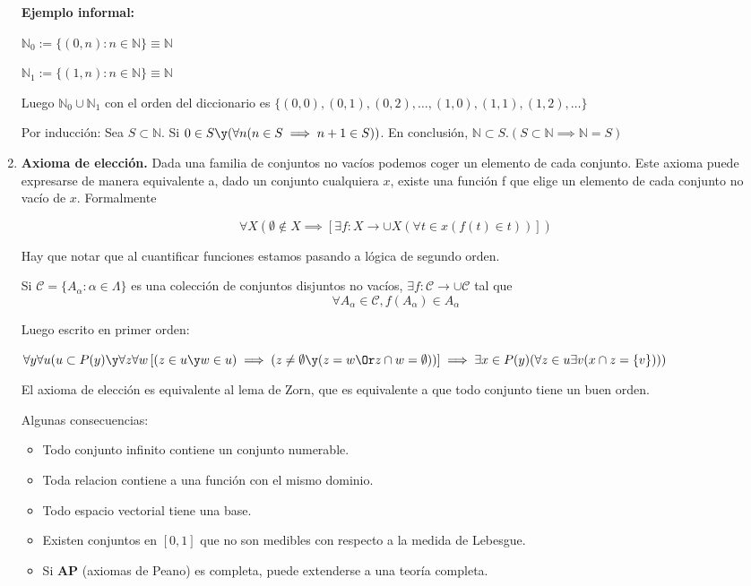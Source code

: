 \begin{enumerate}
		 \textbf{Ejemplo informal:}

		 $\mathbb{N}_0:=\{(0, n): n\in \mathbb{N}\}\equiv \mathbb{N}$

		 $\mathbb{N}_1:=\{(1, n): n\in \mathbb{N}\}\equiv \mathbb{N}$

		 Luego $\mathbb{N}_0\cup\mathbb{N}_1$ con el orden del diccionario es $\{(0,0), (0,1), (0,2), \hdots, (1,0),(1,1), (1,2), \hdots\}$

		 Por inducción: Sea $S\subset\mathbb{N}$. Si $0\in S\y(\forall n(n\in S\implies n+1\in S))$. En conclusión, $\mathbb{N}\subset S. (S\subset \mathbb{N}\implies \mathbb{N}=S)$

		 \item \textbf{Axioma de elección.} Dada una familia de conjuntos no vacíos podemos coger un elemento de cada conjunto. Este axioma puede expresarse de manera equivalente a, dado un conjunto cualquiera $x$, existe una función f que elige un elemento de cada conjunto no vacío de $x$. Formalmente

		 $$\forall X(\emptyset\notin X \implies \left[ \exists f:X\to\cup X (\forall t\in x(f(t)\in t))\right])$$

		 Hay que notar que al cuantificar funciones estamos pasando a lógica de segundo orden.

		 Si $\mathcal{C}=\{A_\alpha: \alpha\in \Lambda\}$ es una colección de conjuntos disjuntos no vacíos, $\exists f:\mathcal{C}\to \cup\mathcal{C}$ tal que $$\forall A_\alpha \in \mathcal{C}, f(A_\alpha)\in A_\alpha$$

		 Luego escrito en primer orden:

		 $\forall y\forall u (u\subset P(y) \y \forall z\forall w\left[(z\in u \y w\in u)\implies (z\neq \emptyset\y (z = w \Or z\cap w = \emptyset ))\right]\implies \exists x \in P(y) (\forall z \in u \exists v (x\cap z = \{v\})))$

		 El axioma de elección es equivalente al lema de Zorn, que es equivalente a que todo conjunto tiene un buen orden.

		 Algunas consecuencias:
		 \begin{itemize}
		 	\item Todo conjunto infinito contiene un conjunto numerable.
		 	\item Toda relacion contiene a una función con el mismo dominio.
		 	\item Todo espacio vectorial tiene una base.
		 	\item Existen conjuntos en $[0,1]$ que no son medibles con respecto a la medida de Lebesgue.
		 	\item Si \textbf{AP} (axiomas de Peano) es completa, puede extenderse a una teoría completa.
		 \end{itemize}
	\end{enumerate}

